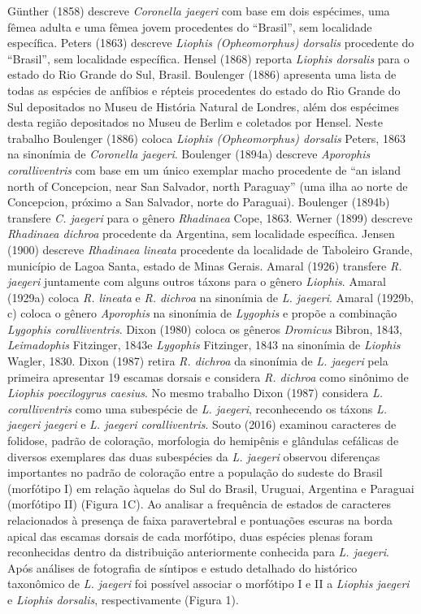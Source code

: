 \documentclass[
]{article}
\begin{document}
Günther (1858) descreve \emph{Coronella jaegeri} com base em dois
espécimes, uma fêmea adulta e uma fêmea jovem procedentes do ``Brasil'',
sem localidade específica. Peters (1863) descreve \emph{Liophis
(Opheomorphus) dorsalis} procedente do ``Brasil'', sem localidade
específica. Hensel (1868) reporta \emph{Liophis dorsalis} para o estado
do Rio Grande do Sul, Brasil. Boulenger (1886) apresenta uma lista de
todas as espécies de anfíbios e répteis procedentes do estado do Rio
Grande do Sul depositados no Museu de História Natural de Londres, além
dos espécimes desta região depositados no Museu de Berlim e coletados
por Hensel. Neste trabalho Boulenger (1886) coloca \emph{Liophis
(Opheomorphus) dorsalis} Peters, 1863 na sinonímia de \emph{Coronella
jaegeri}. Boulenger (1894a) descreve \emph{Aporophis coralliventris} com
base em um único exemplar macho procedente de ``an island north of
Concepcion, near San Salvador, north Paraguay'' (uma ilha ao norte de
Concepcion, próximo a San Salvador, norte do Paraguai). Boulenger
(1894b) transfere \emph{C. jaegeri} para o gênero \emph{Rhadinaea} Cope,
1863. Werner (1899) descreve \emph{Rhadinaea dichroa} procedente da
Argentina, sem localidade específica. Jensen (1900) descreve
\emph{Rhadinaea lineata} procedente da localidade de Taboleiro Grande,
município de Lagoa Santa, estado de Minas Gerais. Amaral (1926)
transfere \emph{R. jaegeri} juntamente com alguns outros táxons para o
gênero \emph{Liophis}. Amaral (1929a) coloca \emph{R. lineata} e
\emph{R. dichroa} na sinonímia de \emph{L. jaegeri}. Amaral (1929b, c)
coloca o gênero \emph{Aporophis} na sinonímia de \emph{Lygophis} e
propõe a combinação \emph{Lygophis coralliventris}. Dixon (1980) coloca
os gêneros \emph{Dromicus} Bibron, 1843, \emph{Leimadophis} Fitzinger,
1843e \emph{Lygophis} Fitzinger, 1843 na sinonímia de \emph{Liophis}
Wagler, 1830. Dixon (1987) retira \emph{R. dichroa} da sinonímia de
\emph{L. jaegeri} pela primeira apresentar 19 escamas dorsais e
considera \emph{R. dichroa} como sinônimo de \emph{Liophis poecilogyrus
caesius}. No mesmo trabalho Dixon (1987) considera \emph{L.
coralliventris} como uma subespécie de \emph{L. jaegeri}, reconhecendo
os táxons \emph{L. jaegeri jaegeri} e \emph{L. jaegeri coralliventris}.
Souto (2016) examinou caracteres de folidose, padrão de coloração,
morfologia do hemipênis e glândulas cefálicas de diversos exemplares das
duas subespécies da \emph{L. jaegeri} observou diferenças importantes no
padrão de coloração entre a população do sudeste do Brasil (morfótipo I)
em relação àquelas do Sul do Brasil, Uruguai, Argentina e Paraguai
(morfótipo II) (Figura 1C). Ao analisar a frequência de estados de
caracteres relacionados à presença de faixa paravertebral e pontuações
escuras na borda apical das escamas dorsais de cada morfótipo, duas
espécies plenas foram reconhecidas dentro da distribuição anteriormente
conhecida para \emph{L. jaegeri}. Após análises de fotografia de
síntipos e estudo detalhado do histórico taxonômico de \emph{L. jaegeri}
foi possível associar o morfótipo I e II a \emph{Liophis jaegeri} e
\emph{Liophis dorsalis}, respectivamente (Figura 1).
\end{document}
